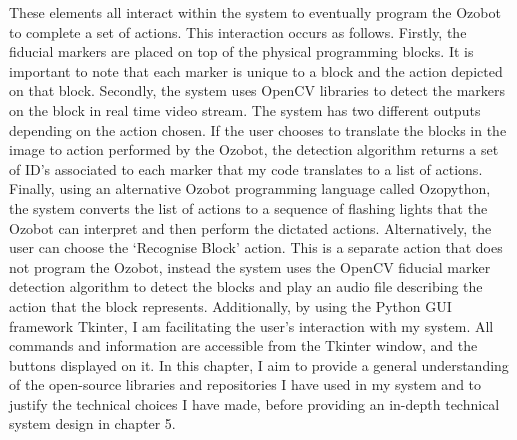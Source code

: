 \documentclass[oneside,%
                    author={Malak Hajji},
                    degree={BSc},
                    title={Designing An Accessible Computational Toolkit For Students},
                  subtitle={With Mixed Visual Abilities}]{dissertation}
\begin{document}
\noindent
These elements all interact within the system to eventually program the Ozobot to complete a set of actions. This interaction occurs as follows.
 Firstly, the fiducial markers are placed on top of the physical programming blocks. It is important to note that each marker is unique to a block and the action depicted on that block. Secondly, the system uses OpenCV libraries to detect the markers on the block in real time video stream. The system has two different outputs depending on the action chosen. If the user chooses to translate the blocks in the image to action performed by the Ozobot, the detection algorithm returns a set of ID’s associated to each marker that my code translates to a list of actions. Finally, using an alternative Ozobot programming language called Ozopython, the system converts the list of actions to a sequence of flashing lights that the Ozobot can interpret and then perform the dictated actions. 
Alternatively, the user can choose the ‘Recognise Block’ action. This is a separate action that does not program the Ozobot, instead the system uses the OpenCV fiducial marker detection algorithm to detect the blocks and play an audio file describing the action that the block represents. 
Additionally, by using the Python GUI framework Tkinter, I am facilitating the user’s interaction with my system. All commands and information are accessible from the Tkinter window, and the buttons displayed on it. 
In this chapter, I aim to provide a general understanding of the open-source libraries and repositories I have used in my system and to justify the technical choices I have made, before providing an in-depth technical system design in chapter 5.
\end{document}
